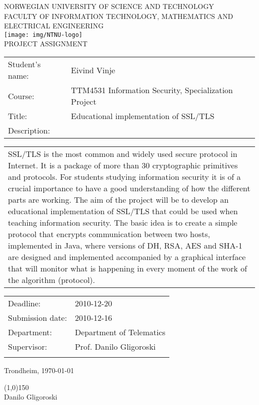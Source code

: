 \documentclass[12pt,b5paper,titlepage]{report}
\begin{document}
\begin{center}
\textsc{NORWEGIAN UNIVERSITY OF SCIENCE AND TECHNOLOGY\\
FACULTY OF  INFORMATION TECHNOLOGY, MATHEMATICS AND ELECTRICAL ENGINEERING} \\
\vspace{0.5cm} 
\texttt{[image: img/NTNU-logo]} \\

\vspace{1.0cm}
{\Huge{PROJECT ASSIGNMENT}}
\vspace{1.0cm}

\begin{tabular}{ p{4cm} p{11cm}}
Student's name:	& Eivind Vinje \\
Course: & TTM4531 Information Security, Specialization Project \\
Title: & Educational implementation of SSL/TLS \\
Description: & \\
\end{tabular}
{\small{\begin{tabular}{p{15cm}}
\vspace{0.2cm}
SSL/TLS is the most common and widely used secure protocol in Internet. It is a package of more than 30 cryptographic primitives and protocols. For students studying information security it is of a crucial importance to have a good understanding of how the different parts are working. The aim of the project will be to develop an educational implementation of SSL/TLS that could be used when teaching information security. The basic idea is to create a simple protocol that encrypts communication between two hosts, implemented in Java, where versions of DH, RSA, AES and SHA-1 are designed and implemented accompanied by a graphical interface that will monitor what is happening in every moment of the work of the algorithm (protocol).
\end{tabular}  }}

\begin{tabular}{ p{4cm} p{11cm}}
Deadline: & 2010-12-20 \\
Submission date: & 2010-12-16 \\
Department: & Department of Telematics \\
Supervisor: & Prof. Danilo Gligoroski\\\\
\end{tabular}
\vspace{0.5cm}

Trondheim, \today 

\vspace{1cm}
\line(1,0){150} \\
Danilo Gligoroski
\end{center}
\end{document}
